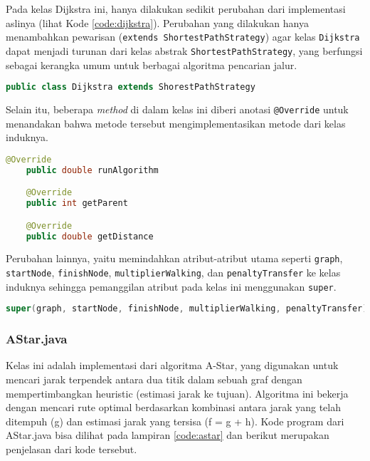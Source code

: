 Pada kelas Dijkstra ini, hanya dilakukan sedikit perubahan dari implementasi aslinya (lihat Kode \ref{code:dijkstra}). Perubahan yang dilakukan hanya menambahkan pewarisan (\texttt{extends ShortestPathStrategy}) agar kelas \texttt{Dijkstra} dapat menjadi turunan dari kelas abstrak \texttt{ShortestPathStrategy}, yang berfungsi sebagai kerangka umum untuk berbagai algoritma pencarian jalur. 

\begin{lstlisting}[language=Java, caption=Dijkstra.java, basicstyle=\small\ttfamily]
    public class Dijkstra extends ShorestPathStrategy
\end{lstlisting}

Selain itu, beberapa \textit{method} di dalam kelas ini diberi anotasi \texttt{@Override} untuk menandakan bahwa metode tersebut mengimplementasikan metode dari kelas induknya.
\begin{lstlisting}[language=Java, caption=Dijkstra.java, basicstyle=\small\ttfamily]
    @Override
    public double runAlgorithm

    @Override
    public int getParent

    @Override
    public double getDistance
\end{lstlisting}

Perubahan lainnya, yaitu memindahkan atribut-atribut utama seperti \texttt{graph}, \texttt{startNode}, \texttt{finishNode}, \texttt{multiplierWalking}, dan \texttt{penaltyTransfer} ke kelas induknya sehingga pemanggilan atribut pada kelas ini menggunakan \texttt{super}.

\begin{lstlisting}[language=Java, caption=Dijkstra.java, basicstyle=\small\ttfamily]
 super(graph, startNode, finishNode, multiplierWalking, penaltyTransfer);
\end{lstlisting}

\subsubsection{AStar.java}
Kelas ini adalah implementasi dari algoritma A-Star, yang digunakan untuk mencari jarak terpendek antara dua titik dalam sebuah graf dengan mempertimbangkan heuristic (estimasi jarak ke tujuan). Algoritma ini bekerja dengan mencari rute optimal berdasarkan kombinasi antara jarak yang telah ditempuh (g) dan estimasi jarak yang tersisa (f = g + h). Kode program dari AStar.java bisa dilihat pada lampiran \ref{code:astar} dan berikut merupakan penjelasan dari kode tersebut.

